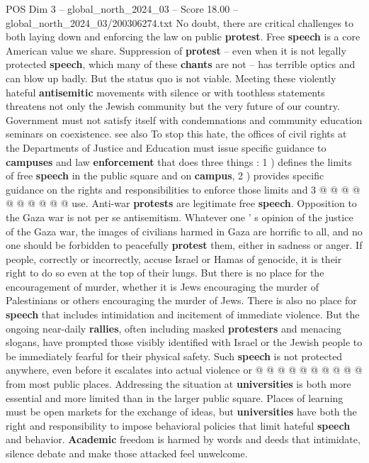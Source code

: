 \begin{textsample}{POS Dim 3 – global\_north\_2024\_03 – Score 18.00 – global\_north\_2024\_03/200306274.txt}
No doubt, there are critical challenges to both laying down and enforcing the law on public \textbf{protest}.
Free \textbf{speech} is a core American value we share.
Suppression of \textbf{protest} -- even when it is not legally protected \textbf{speech}, which many of these \textbf{chants} are not -- has terrible optics and can blow up badly.
But the status quo is not viable.
Meeting these violently hateful \textbf{antisemitic} movements with silence or with toothless statements threatens not only the Jewish community but the very future of our country.
Government must not satisfy itself with condemnations and community education seminars on coexistence. see also To stop this hate, the offices of civil rights at the Departments of Justice and Education must issue specific guidance to \textbf{campuses} and law \textbf{enforcement} that does three things : 1 ) defines the limits of free \textbf{speech} in the public square and on \textbf{campus}, 2 ) provides specific guidance on the rights and responsibilities to enforce those limits and 3 @ @ @ @ @ @ @ @ @ @ use.
Anti-war \textbf{protests} are legitimate free \textbf{speech}.
Opposition to the Gaza war is not per se antisemitism.
Whatever one ' s opinion of the justice of the Gaza war, the images of civilians harmed in Gaza are horrific to all, and no one should be forbidden to peacefully \textbf{protest} them, either in sadness or anger.
If people, correctly or incorrectly, accuse Israel or Hamas of genocide, it is their right to do so even at the top of their lungs.
But there is no place for the encouragement of murder, whether it is Jews encouraging the murder of Palestinians or others encouraging the murder of Jews.
There is also no place for \textbf{speech} that includes intimidation and incitement of immediate violence.
But the ongoing near-daily \textbf{rallies}, often including masked \textbf{protesters} and menacing slogans, have prompted those visibly identified with Israel or the Jewish people to be immediately fearful for their physical safety.
Such \textbf{speech} is not protected anywhere, even before it escalates into actual violence or @ @ @ @ @ @ @ @ @ @ from most public places.
Addressing the situation at \textbf{universities} is both more essential and more limited than in the larger public square.
Places of learning must be open markets for the exchange of ideas, but \textbf{universities} have both the right and responsibility to impose behavioral policies that limit hateful \textbf{speech} and behavior. \textbf{Academic} freedom is harmed by words and deeds that intimidate, silence debate and make those attacked feel unwelcome.

\end{textsample}
